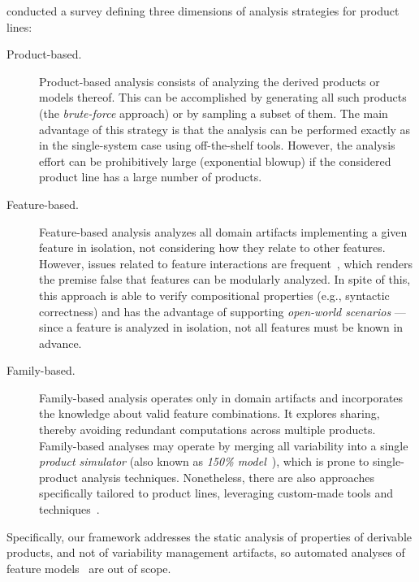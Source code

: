 \citet{Thum2014} conducted a survey defining three dimensions of analysis strategies for product lines:
\begin{description}
    \item[Product-based.]
        Product-based analysis consists of analyzing the derived products or models thereof. This can be
        accomplished by generating all such products (the \emph{brute-force}
        approach) or by sampling a subset of them.
        The main advantage of this strategy is that the analysis can be
        performed exactly as in the single-system case using off-the-shelf tools.
        However, the analysis effort can be prohibitively large
        (exponential blowup) if the considered product line has a large number
        of products.

    \item[Feature-based.]
        Feature-based analysis analyzes all domain artifacts implementing a given feature in
        isolation, not considering how they relate to other features.
        However, issues related to feature interactions are frequent~\cite{IndustrialAnalysisSurvey, SamplingStrategies, FeatureInteractionFaults}, which
        renders the premise false that features can be modularly analyzed.
        In spite of this, this approach is able to verify compositional
        properties (e.g., syntactic correctness) and has the advantage of
        supporting \emph{open-world scenarios} --- since a feature is analyzed
        in isolation, not all features must be known in advance.

    \item[Family-based.]
        Family-based analysis operates only in domain artifacts and incorporates the knowledge about valid feature combinations. It explores sharing, thereby avoiding redundant computations across multiple products.
        Family-based analyses may operate by merging all variability
        into a single \emph{product simulator} (also known as \emph{150\% model}~\cite{150Model}), which is prone to single-product analysis techniques.
        Nonetheless, there are also approaches specifically tailored to product lines, leveraging custom-made tools and techniques~\cite{DelawareCB09,LienhardtDTT18}.
\end{description}

Specifically, our framework addresses the static analysis of  properties of derivable products, and not of variability management  artifacts, so automated analyses of feature models~\cite{BENAVIDES2010615} are out of scope.


